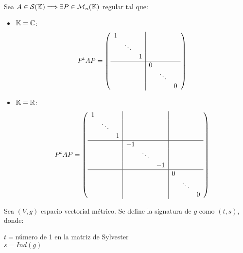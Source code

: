\begin{coro} Sea $A\in \mathcal{S}(\mathbb{K}) \Longrightarrow \exists P\in \mathcal{M}_n(\mathbb{K})$ regular tal que:
\begin{itemize}
        \item \underline{$\mathbb{K} = \mathbb{C}$}:
        \begin{equation*}
            P^tAP = \left( \begin{array}{ccc|ccc}
                1&&&&& \\
                &\ddots&&&& \\
                &&1&&& \\ \hline
                &&&0&& \\
                &&&&\ddots& \\
                &&&&&0 \\
            \end{array}\right)
        \end{equation*}

        \item \underline{$\mathbb{K} = \mathbb{R}$}:
        \begin{equation*}
            P^tAP = \left( \begin{array}{ccc|ccc|ccc}
                1&&&&&&& \\
                &\ddots &&&&&&& \\
                &&1&&&&&& \\ \hline
                &&&-1&&&&& \\
                &&&&\ddots&&&& \\
                &&&&&-1&&& \\ \hline
                &&&&&&0&& \\
                &&&&&&&\ddots & \\
                &&&&&&&&0 \\
            \end{array}\right)
        \end{equation*}
    \end{itemize}
\end{coro}

\begin{definicion}[Signatura]
    Sea $(V,g)$ espacio vectorial métrico. Se define la signatura de $g$ como $(t, s)$, donde:
    \begin{center}
        $t=$número de 1 en la matriz de Sylvester \\
        $s=Ind(g)$
    \end{center}
\end{definicion}

